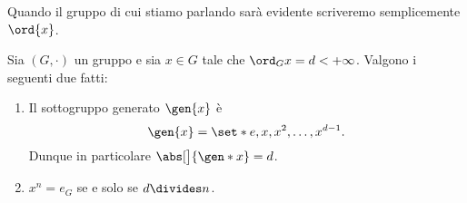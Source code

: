 Quando il gruppo di cui stiamo parlando sarà evidente scriveremo semplicemente $\ord{x}$.

\begin{proposition}
     \label{prop:sgr_generato}
    Sia $(G, \cdot)$ un gruppo e sia $x \in G$ tale che $\ord_{G}{x} = d < +\infty$. 
    Valgono i seguenti due fatti:
    \begin{enumerate}[label={(\roman*)}, ref={\theproposition: (\roman*)}]
        \item \label{prop:sgr_generato:expr} Il sottogruppo generato $\gen{x}$ è \[
            \gen{x} = \set*{e, x, x^2, \dots, x^{d-1}}.    
        \] Dunque in particolare $\abs[\big]{\gen* x} = d$.
        \item \label{prop:sgr_generato:ord_div_n} $x^n = e_G$ se e solo se $d \divides n$.
    \end{enumerate}
\end{proposition}
